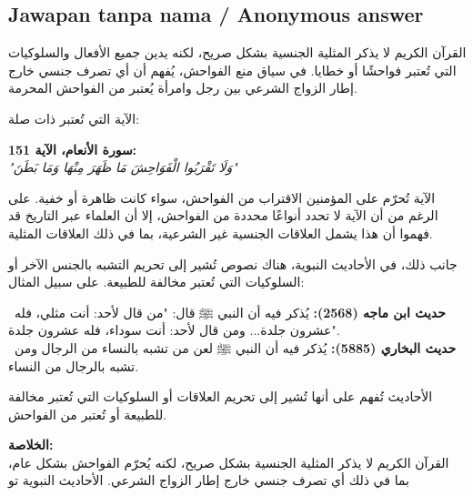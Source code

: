 \documentclass[11pt,a4paper]{article}
\newcommand{\ar}[1]{{\arabicfont #1}}
\begin{document}
\subsection*{Jawapan tanpa nama / Anonymous answer}
\ar{القرآن} \ar{الكريم} \ar{لا} \ar{يذكر} \ar{المثلية} \ar{الجنسية} \ar{بشكل} \ar{صريح،} \ar{لكنه} \ar{يدين} \ar{جميع} \ar{الأفعال} \ar{والسلوكيات} \ar{التي} \ar{تُعتبر} \ar{فواحشًا} \ar{أو} \ar{خطايا}. \ar{في} \ar{سياق} \ar{منع} \ar{الفواحش،} \ar{يُفهم} \ar{أن} \ar{أي} \ar{تصرف} \ar{جنسي} \ar{خارج} \ar{إطار} \ar{الزواج} \ar{الشرعي} \ar{بين} \ar{رجل} \ar{وامرأة} \ar{يُعتبر} \ar{من} \ar{الفواحش} \ar{المحرمة}.\par\medskip \ar{من} \ar{الآية} \ar{التي} \ar{تُعتبر} \ar{ذات} \ar{صلة}:\par\medskip \textbf{\ar{سورة} \ar{الأنعام،} \ar{الآية} 151:}\\ \emph{"\ar{وَلَا} \ar{تَقْرَبُوا} \ar{الْفَوَاحِشَ} \ar{مَا} \ar{ظَهَرَ} \ar{مِنْهَا} \ar{وَمَا} \ar{بَطَنَ}"}\par\medskip \ar{هذه} \ar{الآية} \ar{تُحرّم} \ar{على} \ar{المؤمنين} \ar{الاقتراب} \ar{من} \ar{الفواحش،} \ar{سواء} \ar{كانت} \ar{ظاهرة} \ar{أو} \ar{خفية}. \ar{على} \ar{الرغم} \ar{من} \ar{أن} \ar{الآية} \ar{لا} \ar{تحدد} \ar{أنواعًا} \ar{محددة} \ar{من} \ar{الفواحش،} \ar{إلا} \ar{أن} \ar{العلماء} \ar{عبر} \ar{التاريخ} \ar{قد} \ar{فهموا} \ar{أن} \ar{هذا} \ar{يشمل} \ar{العلاقات} \ar{الجنسية} \ar{غير} \ar{الشرعية،} \ar{بما} \ar{في} \ar{ذلك} \ar{العلاقات} \ar{المثلية}.\par\medskip \ar{إلى} \ar{جانب} \ar{ذلك،} \ar{في} \ar{الأحاديث} \ar{النبوية،} \ar{هناك} \ar{نصوص} \ar{تُشير} \ar{إلى} \ar{تحريم} \ar{التشبه} \ar{بالجنس} \ar{الآخر} \ar{أو} \ar{السلوكيات} \ar{التي} \ar{تُعتبر} \ar{مخالفة} \ar{للطبيعة}. \ar{على} \ar{سبيل} \ar{المثال}:\par\medskip \textbullet\ \textbf{\ar{حديث} \ar{ابن} \ar{ماجه} (2568):} \ar{يُذكر} \ar{فيه} \ar{أن} \ar{النبي} \ar{ﷺ} \ar{قال}: "\ar{من} \ar{قال} \ar{لأحد}: \ar{أنت} \ar{مثلي،} \ar{فله} \ar{عشرون} \ar{جلدة}... \ar{ومن} \ar{قال} \ar{لأحد}: \ar{أنت} \ar{سوداء،} \ar{فله} \ar{عشرون} \ar{جلدة}".\\ \textbullet\ \textbf{\ar{حديث} \ar{البخاري} (5885):} \ar{يُذكر} \ar{فيه} \ar{أن} \ar{النبي} \ar{ﷺ} \ar{لعن} \ar{من} \ar{تشبه} \ar{بالنساء} \ar{من} \ar{الرجال} \ar{ومن} \ar{تشبه} \ar{بالرجال} \ar{من} \ar{النساء}.\par\medskip \ar{هذه} \ar{الأحاديث} \ar{تُفهم} \ar{على} \ar{أنها} \ar{تُشير} \ar{إلى} \ar{تحريم} \ar{العلاقات} \ar{أو} \ar{السلوكيات} \ar{التي} \ar{تُعتبر} \ar{مخالفة} \ar{للطبيعة} \ar{أو} \ar{تُعتبر} \ar{من} \ar{الفواحش}.\par\medskip \textbf{\ar{الخلاصة}:}\\ \ar{القرآن} \ar{الكريم} \ar{لا} \ar{يذكر} \ar{المثلية} \ar{الجنسية} \ar{بشكل} \ar{صريح،} \ar{لكنه} \ar{يُحرّم} \ar{الفواحش} \ar{بشكل} \ar{عام،} \ar{بما} \ar{في} \ar{ذلك} \ar{أي} \ar{تصرف} \ar{جنسي} \ar{خارج} \ar{إطار} \ar{الزواج} \ar{الشرعي}. \ar{الأحاديث} \ar{النبوية} \ar{تو}
\end{document}

